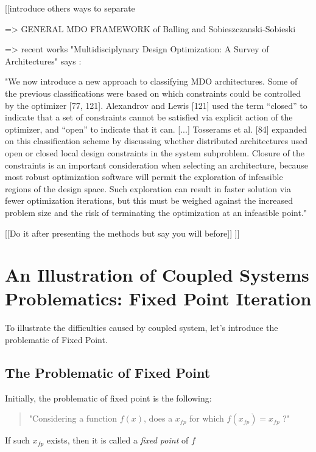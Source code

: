 [[introduce others ways to separate

=> GENERAL MDO FRAMEWORK of Balling and Sobieszczanski-Sobieski

=> recent works "Multidisciplynary Design Optimization: A Survey of Architectures" says : 

"We now introduce a new approach to classifying MDO architectures. Some of the previous classifications were based on which constraints could be controlled by the optimizer [77, 121]. Alexandrov and Lewis [121] used the term “closed” to indicate that a set of constraints cannot be satisfied via explicit action of the optimizer, and “open” to indicate that it can.
[...]
Tosserams et al. [84] expanded on this classification
scheme by discussing whether distributed architectures used open or closed local design constraints in the system subproblem. Closure of the constraints is an important consideration when selecting an architecture, because most robust optimization software will permit the exploration of infeasible regions of the design space. Such exploration can result in faster solution via fewer optimization iterations, but this must be weighed against the increased problem size and the risk of terminating the optimization at an infeasible point."


[[Do it after presenting the methods but say you will before]]
]]

\section{An Illustration of Coupled Systems Problematics: Fixed Point Iteration}

To illustrate the difficulties caused by coupled system, let's introduce the problematic of Fixed Point.

\subsection{The Problematic of Fixed Point}

Initially, the problematic of fixed point is the following:

\begin{quote}"Considering a function $f(x)$, does a $x_{fp}$ for which $f(x_{fp}) = x_{fp}$ ?"\end{quote}

If such $x_{fp}$ exists, then it is called a \emph{fixed point} of $f$


